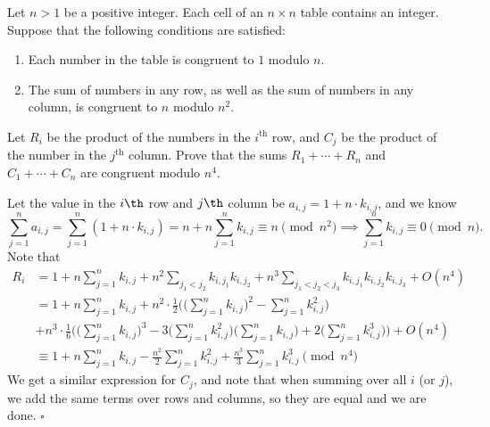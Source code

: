 
\begin{problem}[ISL 2018 N2]
    Let $n>1$ be a positive integer. Each cell of an $n\times n$ table contains
    an integer. Suppose that the following conditions are satisfied:
    \begin{enumerate}
          \item Each number in the table is congruent to $1$ modulo $n$.
          \item The sum of numbers in any row, as well as the sum of numbers in
          any column, is congruent to $n$ modulo $n^2$.
    \end{enumerate}
    Let $R_i$ be the product of the numbers in the $i^{\text{th}}$ row, and
    $C_j$ be the product of the number in the $j^{\text{th}}$ column. Prove that
    the sums $R_1 + \cdots + R_n$ and $C_1 + \cdots + C_n$ are congruent modulo $n^4$.
\end{problem}

\begin{solution}[Ritwin]
    Let the value in the $i\th$ row and $j\th$ column be $a_{i,j} = 1 + n \cdot k_{i,j}$,
    and we know \[\sum_{j=1}^n a_{i,j} = \sum_{j=1}^n (1 + n \cdot k_{i,j}) = n + n \sum_{j=1}^n k_{i,j} \equiv n\!\!\!\! \pmod{n^2} \implies \sum_{j=1}^n k_{i,j} \equiv 0\!\!\!\! \pmod n.\]
    Note that \begin{align*}
        R_i &= 1 + n \sum_{j=1}^n k_{i,j} + n^2 \sum_{j_1<j_2} k_{i,j_1}k_{i,j_2} + n^3 \sum_{j_1<j_2<j_3} k_{i,j_1}k_{i,j_2}k_{i,j_3} + O(n^4)\\
        &= 1 + n\sum_{j=1}^nk_{i,j} + n^2 \cdot \frac12\bigg(\bigg(\sum_{j=1}^nk_{i,j}\bigg)^2 - \sum_{j=1}^nk_{i,j}^2\bigg)\\
        &+ n^3 \cdot \frac16\bigg(\bigg(\sum_{j=1}^nk_{i,j}\bigg)^3 - 3\bigg(\sum_{j=1}^nk_{i,j}^2\bigg)\bigg(\sum_{j=1}^nk_{i,j}\bigg) + 2\bigg(\sum_{j=1}^nk_{i,j}^3\bigg)\bigg) + O(n^4)\\
        &\equiv 1 + n\sum_{j=1}^nk_{i,j} - \frac{n^2}{2}\sum_{j=1}^n k_{i,j}^2 + \frac{n^3}{3}\sum_{j=1}^n k_{i,j}^3 \pmod{n^4}
    \end{align*}
    We get a similar expression for $C_j$, and note that when summing over all
    $i$ (or $j$), we add the same terms over rows and columns, so they are equal
    and we are done. $\square$
\end{solution}
